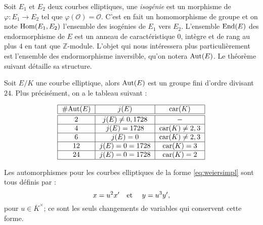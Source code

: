 \documentclass[a4paper]{article} %
\numberwithin{section}{part}
\numberwithin{equation}{section}
\newcommand\ZZ{\mathbb{Z}}
\newcommand\EO{\mathcal{O}}
\newcommand\etmath{\textup{\quad et \quad}}
\begin{document}
Soit $E_1$ et $E_2$ deux courbes elliptiques, une \emph{isogénie} est un
morphisme de $\varphi : E_1 \rightarrow E_2$ tel que $\varphi(\EO) = \EO$. C'est
en fait un homomorphisme de groupe et on note $\textup{Hom}(E_1, E_2)$
l'ensemble des isogénies de $E_1$ vers $E_2$. L'ensemble $\textup{End}(E)$ des
endormorphisme de $E$ est un anneau de caractéristique $0$, intègre et de rang
au plus $4$ en tant que $\ZZ$-module. L'objet qui nous intéressera plus
particulièrement est l'ensemble des endormorphisme inversible, qu'on notera
$\textup{Aut}(E)$. Le théorème suivant détaille sa structure.
\begin{thm}
\label{th:autell}
Soit $E/K$ une courbe elliptique, alors $\textup{Aut}(E)$ est un groupe fini
d'ordre divisant $24$. Plus précisément, on a le tableau suivant :

\begin{equation}
\begin{tabular}{|c|c|c|}
    \hline
    \#Aut$(E)$ & $j(E)$ & car$(K)$\\
    \hline\hline
    $2$ & $j(E)\neq0,1728$ & $-$\\
    \hline
    $4$ & $j(E) = 1728$ & car$(K)\neq 2, 3$\\
    \hline
    $6$ & $j(E) = 0$ & car$(K)\neq 2, 3$\\
    \hline
    $12$ & $j(E) = 0 = 1728$ & car$(K) = 3$\\
    \hline
    $24$ & $j(E) = 0 = 1728$ & car$(K) = 2$\\
    \hline
\end{tabular}
\end{equation}
\end{thm}
Les automorphismes pour les courbes elliptiques de la forme
\ref{eq:weiersimpl} sont tous définis par : 
\begin{equation}
x = u^2x'\etmath y = u^3y',
\end{equation}
pour $u\in\overline{K}^{\times}$; ce sont les seuls changements de variables qui
conservent cette forme.
\end{document}
